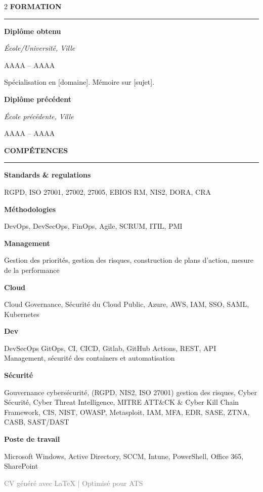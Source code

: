 \documentclass[11pt,a4paper]{article}
\begin{document}
\begin{paracol}{2}
  \vspace{10pt}
  {\large\textbf{FORMATION}}\par
  {\color{accentcolor}\rule{\linewidth}{1pt}}\par
  \vspace{5pt}

  \textbf{Diplôme obtenu}\par
  \textit{École/Université, Ville}\par
  AAAA – AAAA\par
  Spécialisation en [domaine]. Mémoire sur [sujet].\par

  \vspace{10pt}
  \textbf{Diplôme précédent}\par
  \textit{École précédente, Ville}\par
  AAAA – AAAA\par

  \vspace{10pt}
  {\large\textbf{COMPÉTENCES}}\par
  {\color{accentcolor}\rule{\linewidth}{1pt}}\par
  \vspace{5pt}

  \textbf{Standards \& regulations}\par
  RGPD, ISO 27001, 27002, 27005, EBIOS RM, NIS2, DORA, CRA\par
  \vspace{5pt}
  \textbf{Méthodologies}\par
  DevOps, DevSecOps, FinOps, Agile, SCRUM, ITIL, PMI\par
  \vspace{5pt}
  \textbf{Management}\par
  Gestion des priorités, gestion des risques, construction de plans d'action, mesure de la performance\par
  \vspace{5pt}
  \textbf{Cloud}\par
  Cloud Governance, Sécurité du Cloud Public, Azure, AWS, IAM, SSO, SAML, Kubernetes\par
  \vspace{5pt}
  \textbf{Dev}\par
  DevSecOps GitOps, CI, CICD, Gitlab, GitHub Actions, REST, API Management, sécurité des containers et automatisation\par
  \vspace{5pt}
  \textbf{Sécurité}\par
  Gouvernance cybersécurité, (RGPD, NIS2, ISO 27001) gestion des risques, Cyber Sécurité, Cyber Threat Intelligence, MITRE ATT\&CK \& Cyber Kill Chain Framework, CIS, NIST, OWASP, Metasploit, IAM, MFA, EDR, SASE, ZTNA, CASB, SAST/DAST\par
  \vspace{5pt}
  \textbf{Poste de travail}\par
  Microsoft Windows, Active Directory, SCCM, Intune, PowerShell, Office 365, SharePoint\par
\end{paracol}

\vfill
\begin{center}
  \footnotesize\textcolor{gray}{CV généré avec LaTeX | Optimisé pour ATS}
\end{center}
\end{document}
